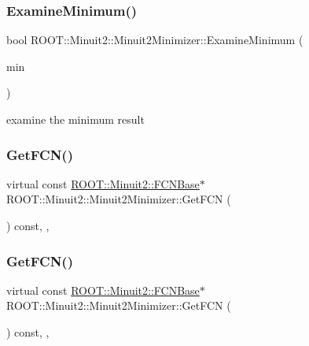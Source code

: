 \subsubsection{\texorpdfstring{ExamineMinimum()}{ExamineMinimum()}\hspace{0.1cm}{\footnotesize\ttfamily [3/3]}}
{\footnotesize\ttfamily bool R\+O\+O\+T\+::\+Minuit2\+::\+Minuit2\+Minimizer\+::\+Examine\+Minimum (\begin{DoxyParamCaption}\item[{const \mbox{\hyperlink{classROOT_1_1Minuit2_1_1FunctionMinimum}{R\+O\+O\+T\+::\+Minuit2\+::\+Function\+Minimum}} \&}]{min }\end{DoxyParamCaption})\hspace{0.3cm}{\ttfamily [protected]}}



examine the minimum result 

\mbox{\label{classROOT_1_1Minuit2_1_1Minuit2Minimizer_aee4d274acbb0db4702010a62ebdd4d56}} 
\subsubsection{\texorpdfstring{GetFCN()}{GetFCN()}\hspace{0.1cm}{\footnotesize\ttfamily [1/3]}}
{\footnotesize\ttfamily virtual const \mbox{\hyperlink{classROOT_1_1Minuit2_1_1FCNBase}{R\+O\+O\+T\+::\+Minuit2\+::\+F\+C\+N\+Base}}$\ast$ R\+O\+O\+T\+::\+Minuit2\+::\+Minuit2\+Minimizer\+::\+Get\+F\+CN (\begin{DoxyParamCaption}{ }\end{DoxyParamCaption}) const\hspace{0.3cm}{\ttfamily [inline]}, {\ttfamily [protected]}, {\ttfamily [virtual]}}

\mbox{\label{classROOT_1_1Minuit2_1_1Minuit2Minimizer_aee4d274acbb0db4702010a62ebdd4d56}} 
\subsubsection{\texorpdfstring{GetFCN()}{GetFCN()}\hspace{0.1cm}{\footnotesize\ttfamily [2/3]}}
{\footnotesize\ttfamily virtual const \mbox{\hyperlink{classROOT_1_1Minuit2_1_1FCNBase}{R\+O\+O\+T\+::\+Minuit2\+::\+F\+C\+N\+Base}}$\ast$ R\+O\+O\+T\+::\+Minuit2\+::\+Minuit2\+Minimizer\+::\+Get\+F\+CN (\begin{DoxyParamCaption}{ }\end{DoxyParamCaption}) const\hspace{0.3cm}{\ttfamily [inline]}, {\ttfamily [protected]}, {\ttfamily [virtual]}}

